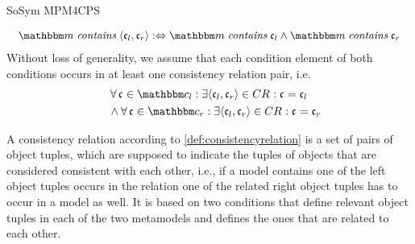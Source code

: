 \begin{copiedFrom}{SoSym MPM4CPS}
\begin{definition}
    \begin{align*}
        \formulaskip & 
        \modelset{m} \mathtext{contains} \tupled{\conditionelement{c}{l}, \conditionelement{c}{r}} \equivalentperdefinition \modelset{m} \mathtext{contains} \conditionelement{c}{l} \land \modelset{m} \mathtext{contains} \conditionelement{c}{r}
    \end{align*}
    Without loss of generality, we assume that each condition element of both conditions occurs in at least one consistency relation pair, i.e.
    \begin{align*}
        \formulaskip & 
        \forall \conditionelement{c}{} \in \condition{c}{l} : \exists \tupled{\conditionelement{c}{l}, \conditionelement{c}{r}} \in \consistencyrelation{CR}{} : \conditionelement{c}{} = \conditionelement{c}{l} \\
        &  
        \land \forall \conditionelement{c}{} \in \condition{c}{r} : \exists \tupled{\conditionelement{c}{l}, \conditionelement{c}{r}} \in \consistencyrelation{CR}{} : \conditionelement{c}{} = \conditionelement{c}{r}
    \end{align*}
\end{definition}

A consistency relation according to \autoref{def:consistencyrelation} is a set of pairs of object tuples, which are supposed to indicate the tuples of objects that are considered consistent with each other, i.e., if a model contains one of the left object tuples occurs in the relation one of the related right object tuples has to occur in a model as well.
It is based on two conditions that define relevant object tuples in each of the two metamodels and defines the ones that are related to each other.


\end{copiedFrom}
